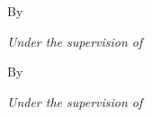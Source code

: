\hypersetup{pageanchor=false}
\begin{titlepage}
    \begin{titlepagetext}
    \centering
    \vspace*{1.5cm}
    \hamdardlogolarge
    \vspace{2.2cm}

    \titlepagetitle
    \vspace{1.2cm}

    {\normalsize By\par}
    \vspace{0.4cm}

    \titlepagestudents

    \vspace{1cm}
    {\normalsize\itshape Under the supervision of\par}
    \vspace{0.3cm}
    {\normalsize\bfseries \supervisorname\par}

    \vfill
    \titlepagefooter
    \end{titlepagetext}
\end{titlepage}

\begin{titlepage}
    \begin{titlepagetext}
    \centering
    \vspace*{1.5cm}
    \hamdardlogolarge
    \vspace{2.2cm}

    \titlepagetitle
    \vspace{1.2cm}

    {\normalsize By\par}
    \vspace{0.4cm}

    \titlepagestudents

    \vspace{1cm}
    {\normalsize\itshape Under the supervision of\par}
    \vspace{0.3cm}
    {\normalsize\bfseries \supervisorname\par}

    \vfill
    \titlepagefooter
    \end{titlepagetext}
\end{titlepage}

